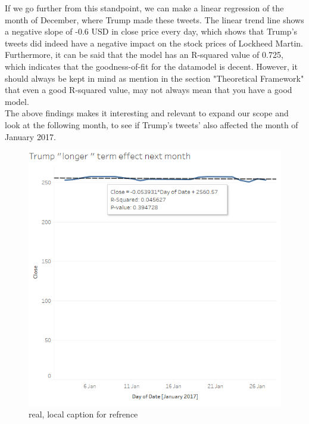 \documentclass{article}
\begin{document}
If we go further from this standpoint, we can make a linear regression of the month of December, where Trump made these tweets. The linear trend line shows a negative slope of -0.6 USD in close price every day, which shows that Trump's tweets did indeed have a negative impact on the stock prices of Lockheed Martin. Furthermore, it can be said that the model has an R-squared value of 0.725, which indicates that the goodness-of-fit for the datamodel is decent. However, it should always be kept in mind as mention in the section "Theoretical Framework" that even a good R-squared value, may not always mean that you have a good model. \\

The above findings makes it interesting and relevant to expand our scope and look at the following month, to see if Trump's tweets' also affected the month of January 2017.

\begin{figure}[H] %
	\centering %
\includegraphics [scale= .6]  {TrumpJanuaryEffect.PNG}    %
	\caption[Optional caption] {real, local caption for refrence}
	\label{fig:wordcloudBliz}

\end{figure}
\end{document}
